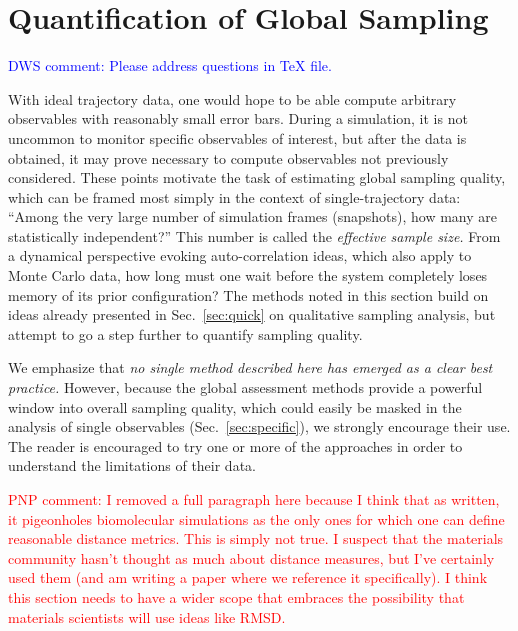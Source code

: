\section{Quantification of Global Sampling}
\label{sec:global}

\textcolor{blue}{DWS comment: Please address questions in TeX file.}

With ideal trajectory data, one would hope to be able compute arbitrary observables with reasonably small error bars.
During a simulation, it is not uncommon to monitor specific observables of interest, but after the data is obtained, it may prove necessary to compute observables not previously considered.
These points motivate the task of estimating global sampling quality, which can be framed most simply in the context of single-trajectory data:
``Among the very large number of simulation frames (snapshots), how many are statistically independent?''
This number is called the \emph{effective sample size.}
From a dynamical perspective evoking auto-correlation ideas, which also apply to Monte Carlo data, how long must one wait before the system completely loses memory of its prior configuration?  
The methods noted in this section build on ideas already presented in Sec.\ \ref{sec:quick} on qualitative sampling analysis, but attempt to go a step further to quantify sampling quality.

We emphasize that \emph{no single method described here has emerged as a clear best practice.}
However, because the global assessment methods provide a powerful window into overall sampling quality, which could easily be masked in the analysis of single observables (Sec.\ \ref{sec:specific}), we strongly encourage their use.
The reader is encouraged to try one or more of the approaches in order to understand the limitations of their data.

\textcolor{red}{PNP comment: I removed a full paragraph here because I think that as written, it pigeonholes biomolecular simulations as the only ones for which one can define reasonable distance metrics.  This is simply not true.  I suspect that the materials community hasn't thought as much about distance measures, but I've certainly used them (and am writing a paper where we reference it specifically).  I think this section needs to have a wider scope that embraces the possibility that materials scientists will use ideas like RMSD.}

